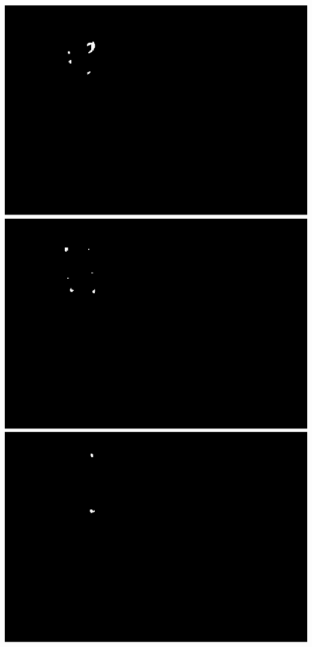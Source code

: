 \documentclass[]{article}
\begin{document}
\includegraphics{tapas-vignette_files/figure-latex/unnamed-chunk-9-1.pdf}
\includegraphics{tapas-vignette_files/figure-latex/unnamed-chunk-9-2.pdf}
\includegraphics{tapas-vignette_files/figure-latex/unnamed-chunk-9-3.pdf}
\end{document}

